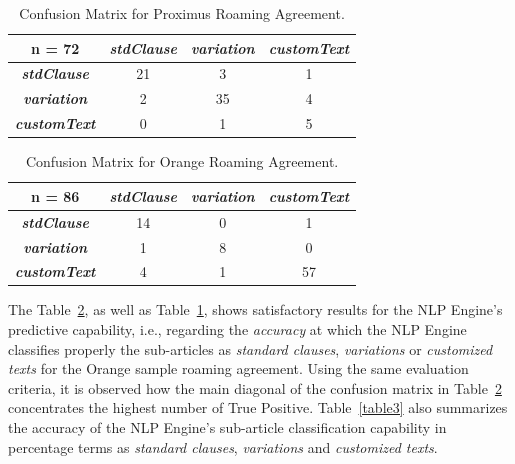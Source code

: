 \begin{table}[htbp]
\caption{Confusion Matrix for Proximus Roaming Agreement.}
\begin{center}
\begin{tabular}{|c|c|c|c|}
\hline
\textbf{n = 72} & \textbf{\textit{stdClause}}& \textbf{\textit{variation}}& \textbf{\textit{customText}} \\
\hline
\textbf{\textit{stdClause}}& 21 & 3 & 1 \\
\hline
\textbf{\textit{variation}}& 2 & 35 & 4 \\
\hline
\textbf{\textit{customText}}& 0 & 1 & 5 \\
\hline
\end{tabular}
\label{table1}
\end{center}
\end{table}

\begin{table}[htbp]
\caption{Confusion Matrix for Orange Roaming Agreement.}
\begin{center}
\begin{tabular}{|c|c|c|c|}
\hline
\textbf{n = 86} & \textbf{\textit{stdClause}}& \textbf{\textit{variation}}& \textbf{\textit{customText}} \\
\hline
\textbf{\textit{stdClause}}& 14 & 0 & 1 \\
\hline
\textbf{\textit{variation}}& 1 & 8 & 0 \\
\hline
\textbf{\textit{customText}}& 4 & 1 & 57 \\
\hline
\end{tabular}
\label{table2}
\end{center}
\end{table}

The Table~\ref{table2}, as well as Table~\ref{table1}, shows satisfactory results for the NLP Engine's predictive capability, i.e., regarding the \textit{accuracy} at which the NLP Engine classifies properly the sub-articles as \textit{standard clauses}, \textit{variations} or \textit{customized texts} for the Orange sample roaming agreement. Using the same evaluation criteria, it is observed how the main diagonal of the confusion matrix in Table~\ref{table2} concentrates the highest number of True Positive. Table~\ref{table3} also summarizes the accuracy of the NLP Engine's sub-article classification capability in percentage terms as \textit{standard clauses}, \textit{variations} and \textit{customized texts}.

